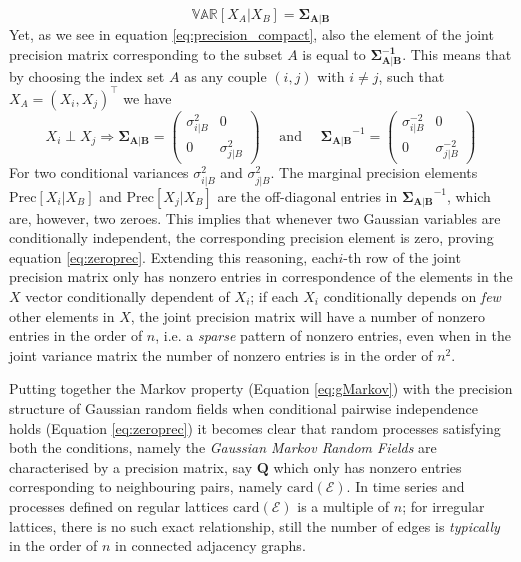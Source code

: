 \documentclass[openany, 11pt, oneside]{book}
\begin{document}
$$
\mathbb{VAR}\left[ X_A \vert X_B \right] = \boldsymbol{\Sigma_{A \vert B}}
$$
Yet, as we see in equation \ref{eq:precision_compact}, also the element of the joint precision matrix corresponding to the subset $A$ is equal to $\boldsymbol{\Sigma_{A \vert B}^{-1}}$. This means that by choosing the index set $A$ as any couple $(i,j)$ with $i \neq j$, such that $X_A = (X_i, X_j)^\top$ we have 
%
$$ X_i \perp X_j \Longrightarrow
\boldsymbol{\Sigma_{A \vert B}} = \begin{pmatrix}
\sigma_{i\vert B}^2 & 0 \\ 0 & \sigma_{j\vert B}^{2} 
\end{pmatrix}
\quad \text{ and } \quad
\boldsymbol{\Sigma_{A \vert B}}^{-1} = \begin{pmatrix}
\sigma_{i\vert B}^{-2} & 0 \\ 0 & \sigma_{j\vert B}^{-2} 
\end{pmatrix}
$$
%
For two conditional variances $\sigma_{i\vert B}^{2}$ and $\sigma_{j\vert B}^{2}$. The marginal precision elements $\mathrm{Prec}[X_i \vert X_B]$ and $\mathrm{Prec}[X_j \vert X_B]$ are the off-diagonal entries in $\boldsymbol{\Sigma_{A \vert B}}^{-1}$, which are, however, two zeroes. This implies that whenever two Gaussian variables are conditionally independent, the corresponding precision element is zero, proving equation \ref{eq:zeroprec}. Extending this reasoning, each$i$-th row of the joint precision matrix only has nonzero entries in correspondence of the elements in the $X$ vector conditionally dependent of $X_i$; if each $X_i$ conditionally depends on \textit{few} other elements in $X$, the joint precision matrix will have a number of nonzero entries in the order of $n$, i.e. a \textit{sparse} pattern of nonzero entries, even when in the joint variance matrix the number of nonzero entries is in the order of $n^2$. 

Putting together the Markov property (Equation \ref{eq:gMarkov}) with the precision structure of Gaussian random fields when conditional pairwise independence holds (Equation \ref{eq:zeroprec}) it becomes clear that random processes satisfying both the conditions, namely the \textit{Gaussian Markov Random Fields} are characterised by a precision matrix, say $\boldsymbol{Q}$ which only has nonzero entries corresponding to neighbouring pairs, namely $\mathrm{card}(\mathcal{E})$. In time series and processes defined on regular lattices $\mathrm{card}(\mathcal{E})$ is a multiple of $n$; for irregular lattices, there is no such exact relationship, still the number of edges is \textit{typically} in the order of $n$ in connected adjacency graphs.
\end{document}
